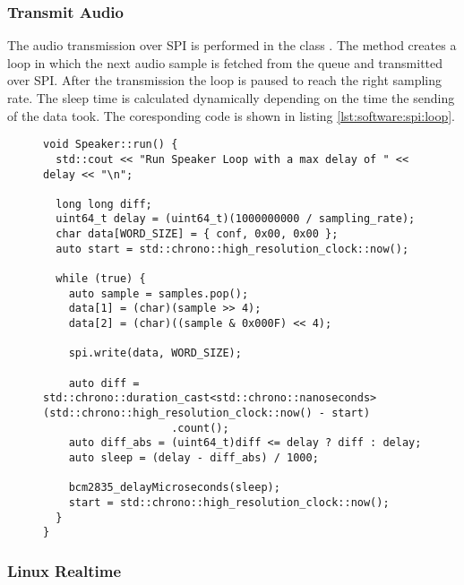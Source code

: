 \subsubsection*{Transmit Audio}

The audio transmission over SPI is performed in the class . The method  creates a loop in which the next audio sample is fetched from the  queue and transmitted over SPI. After the transmission the loop is paused to reach the right sampling rate. The sleep time is calculated dynamically depending on the time the sending of the data took. The coresponding code is shown in listing \ref{lst:software:spi:loop}.
\begin{figure}[ht]
\begin{mdframed}
\begin{lstlisting}[caption=Audio transmission loop, label=lst:software:spi:loop]
void Speaker::run() {
  std::cout << "Run Speaker Loop with a max delay of " << delay << "\n";

  long long diff;
  uint64_t delay = (uint64_t)(1000000000 / sampling_rate);
  char data[WORD_SIZE] = { conf, 0x00, 0x00 };
  auto start = std::chrono::high_resolution_clock::now();

  while (true) {
    auto sample = samples.pop();
    data[1] = (char)(sample >> 4);
    data[2] = (char)((sample & 0x000F) << 4);

    spi.write(data, WORD_SIZE);

    auto diff = std::chrono::duration_cast<std::chrono::nanoseconds>(std::chrono::high_resolution_clock::now() - start)
                    .count();
    auto diff_abs = (uint64_t)diff <= delay ? diff : delay;
    auto sleep = (delay - diff_abs) / 1000;

    bcm2835_delayMicroseconds(sleep);
    start = std::chrono::high_resolution_clock::now();
  }
}
\end{lstlisting}
\end{mdframed}
\end{figure}
%
\subsubsection*{Linux Realtime}

